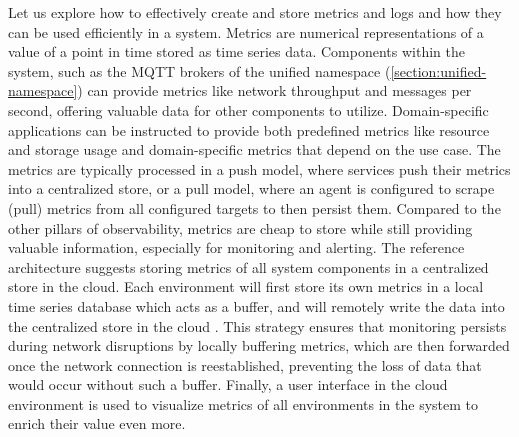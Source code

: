     \noindent Let us explore how to effectively create and store metrics and logs and how they can be used efficiently in a system. Metrics are numerical representations of a value of a point in time stored as time series data. Components within the system, such as the MQTT brokers of the unified namespace (\autoref{section:unified-namespace}) can provide metrics like network throughput and messages per second, offering valuable data for other components to utilize. Domain-specific applications can be instructed to provide both predefined metrics like resource and storage usage and domain-specific metrics that depend on the use case. The metrics are typically processed in a push model, where services push their metrics into a centralized store, or a pull model, where an agent is configured to scrape (pull) metrics from all configured targets to then persist them. Compared to the other pillars of observability, metrics are cheap to store while still providing valuable information, especially for monitoring and alerting. The reference architecture suggests storing metrics of all system components in a centralized store in the cloud. Each environment will first store its own metrics in a local time series database which acts as a buffer, and will remotely write the data into the centralized store in the cloud \cite{building_iiot}. This strategy ensures that monitoring persists during network disruptions by locally buffering metrics, which are then forwarded once the network connection is reestablished, preventing the loss of data that would occur without such a buffer. Finally, a user interface in the cloud environment is used to visualize metrics of all environments in the system to enrich their value even more.

